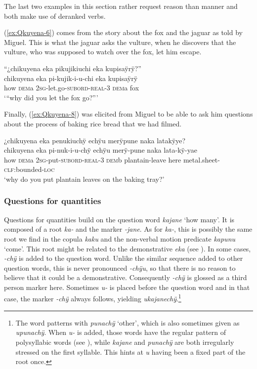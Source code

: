 The last two examples in this section rather request reason than manner and both make use of deranked verbs.

(\ref{ex:Qkuyena-6}) comes from the story about the fox and the jaguar as told by Miguel. This is what the jaguar asks the vulture, when he discovers that the vulture, who was supposed to watch over the fox, let him escape.

\ea\label{ex:Qkuyena-6}
\begingl
\glpreamble “¿chikuyena eka pikujikiuchi eka kupisaÿrÿ?”\\
\gla chikuyena eka pi-kujik-i-u-chi eka kupisaÿrÿ\\
\glb how \textsc{dem}a 2\textsc{sg}-let.go-\textsc{subord}-\textsc{real}-3 \textsc{dem}a fox\\
\glft ‘“why did you let the fox go?”’
\endgl
\trailingcitation{[jmx-n120429ls-x5.179]}
\xe


Finally, (\ref{ex:Qkuyena-8}) was elicited from Miguel to be able to ask him questions about the process of baking rice bread that we had filmed.

\ea\label{ex:Qkuyena-8}
\begingl
\glpreamble ¿chikuyena eka penukiuchÿ echÿu merÿpune naka latakÿye?\\
\gla chikuyena eka pi-nuk-i-u-chÿ echÿu merÿ-pune naka lata-kÿ-yae\\
\glb how \textsc{dem}a 2\textsc{sg}-put-\textsc{subord}-\textsc{real}-3 \textsc{dem}b plantain-leave here metal.sheet-\textsc{clf:}bounded-\textsc{loc}\\
\glft ‘why do you put plantain leaves on the baking tray?’
\endgl
\trailingcitation{[mxx-e120415ls.058]}
\xe


\subsubsection{Questions for quantities}\label{sec:Q_kajane}

Questions for quantities build on the question word \textit{kajane} ‘how many’. It is composed of a root \textit{ka-} and the  marker \textit{-jane}. As for \textit{ka-}, this is possibly the same root we find in the copula \textit{kaku} and the non-verbal motion predicate \textit{kapunu} ‘come’. This root might be related to the demonstrative \textit{eka} (see ). In some cases, \textit{-chÿ} is added to the question word. Unlike the similar sequence added to other question words, this is never pronounced \textit{-chÿu}, so that there is no reason to believe that it could be a demonstrative. Consequently \textit{-chÿ} is glossed as a third person marker here.
Sometimes \textit{u-} is placed before the question word and in that case, the marker \textit{-chÿ} always follows, yielding \textit{ukajanechÿ}.\footnote{The word patterns with \textit{punachÿ} ‘other’, which is also sometimes given as \textit{upunachÿ}. When \textit{u-} is added, those words have the regular  pattern of polysyllabic words (see ), while \textit{kajane} and \textit{punachÿ} are both irregularly stressed on the first syllable. This hints at \textit{u} having been a fixed part of the root once.}

